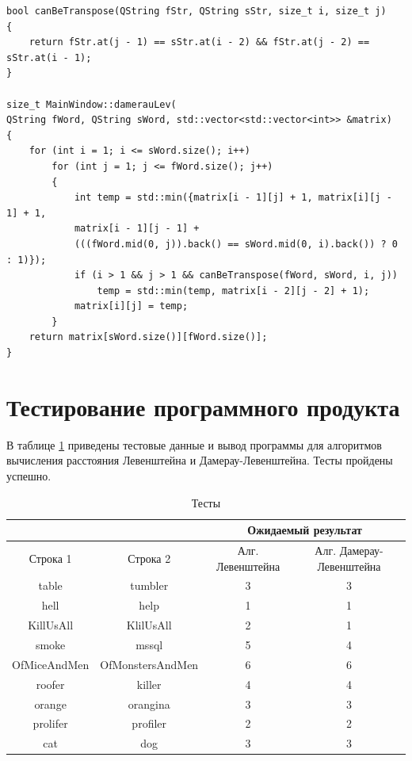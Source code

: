 \documentclass[12pt]{report}
\begin{document}
\begin{lstlisting}[caption=Функция реализации алгоритма Дамерау-Левенштейна,
label={DamLevList}]
bool canBeTranspose(QString fStr, QString sStr, size_t i, size_t j)
{
    return fStr.at(j - 1) == sStr.at(i - 2) && fStr.at(j - 2) == sStr.at(i - 1);
}

size_t MainWindow::damerauLev(
QString fWord, QString sWord, std::vector<std::vector<int>> &matrix)
{
    for (int i = 1; i <= sWord.size(); i++)
        for (int j = 1; j <= fWord.size(); j++)
        {
            int temp = std::min({matrix[i - 1][j] + 1, matrix[i][j - 1] + 1,
            matrix[i - 1][j - 1] +
            (((fWord.mid(0, j)).back() == sWord.mid(0, i).back()) ? 0 : 1)});
            if (i > 1 && j > 1 && canBeTranspose(fWord, sWord, i, j))
                temp = std::min(temp, matrix[i - 2][j - 2] + 1);
            matrix[i][j] = temp;
        }
    return matrix[sWord.size()][fWord.size()];
}
\end{lstlisting}

\section{Тестирование программного продукта}
В таблице \ref{table} приведены тестовые данные и вывод программы для алгоритмов вычисления расстояния Левенштейна и Дамерау-Левенштейна. Тесты пройдены успешно.

\newpage
\begin{table}[h]
	\begin{center}
		\caption{\label{table} Тесты}
		\begin{tabular}{|c|c|c|c|}
	\hline
			                    &                    & \multicolumn{2}{c|}{\bfseries Ожидаемый результат}    \\ \cline{3-4}\hline
	Строка 1& Строка 2 & Алг. Левенштейна & Алг. Дамерау-Левенштейна \\ [0.5ex] 
 	\hline\hline
 	table & tumbler & 3 & 3\\
 	\hline
 	hell & help & 1 & 1\\
 	\hline
	KillUsAll & KlilUsAll & 2 & 1\\
	\hline
	smoke & mssql & 5 & 4\\
	\hline
	OfMiceAndMen & OfMonstersAndMen & 6 & 6\\
	\hline
	roofer & killer & 4 & 4\\
	\hline
	orange & orangina & 3 & 3\\
	\hline
	prolifer & profiler & 2 & 2\\
	\hline
	cat & dog & 3 & 3\\
	\hline
		\end{tabular}
	\end{center}
\end{table}
\end{document}
